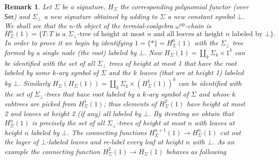 \documentclass[letterpaper, 11pt, oneside]{memoir}
\theoremstyle{myteo}
\newtheorem{remark}[theorem]{Remark}
\numberwithin{equation}{section}
\newcommand{\Set}{\textsf{Set}}
\newcommand{\op}{\text{op}}
\begin{document}
\begin{remark}
  Let \(\Sigma\) be a signature, \(H_\Sigma\) the corresponding polynomial functor (over \(\Set\)) and \(\Sigma_\bot\) a new signature obtained by adding to \(\Sigma\) a new constant symbol \(\bot\).
  We shall see that the \(n\)-th object of the termial-coalgebra \(\omega^\op\)-chain is
  \begin{equation*}
    H^n_\Sigma(1) = \{ T : \text{\(T\) is a \(\Sigma_\bot\)-tree of height at most \(n\) and all leaves at height \(n\) labeled by \(\bot\)}\}.
  \end{equation*}
  In order to prove it we begin by identifying \(1 = \{*\} = H^0_\Sigma(1)\) with the \(\Sigma_\bot\) tree formed by a single node (the root) labeled by \(\bot\).
  Now \(H_\Sigma(1) = \coprod_{k}\Sigma_k \times 1^k\) can be identified with the set of all \(\Sigma_\bot\) trees of height at most 1 that have the root labeled by some \(k\)-ary symbol of \(\Sigma\) and the \(k\) leaves (that are at height 1) labeled by \(\bot\).
  Similarly \(H_\Sigma(H_\Sigma(1)) = \coprod_k \Sigma_k \times (H^1_\Sigma(1))^k\) can be identified with the set of \(\Sigma_\bot\)-trees that have root labeled by a \(k\)-ary symbol of \(\Sigma\) and whose \(k\) subtrees are picked from \(H^1_\Sigma(1)\); thus elements of \(H^2_\Sigma(1)\) have height at most 2 and leaves at height 2 (if any) all labeled by \(\bot\).
  By iterating we obtain that \(H^n_\Sigma(1)\) is precisely the set of all \(\Sigma_\bot\)-trees of height at most \(n\) with leaves at height \(n\) labeled by \(\bot\).
  The connecting functions \(H^{n + 1}_\Sigma(1) \to H^n_\Sigma(1)\) cut out the layer of \(\bot\)-labeled leaves and re-label every leaf at height \(n\) with \(\bot\).
  As an example the connecting function \(H^2_\Sigma(1) \to H_\Sigma(1)\) behaves as following
  \begin{center}
\end{center}
\end{remark}
\end{document}
